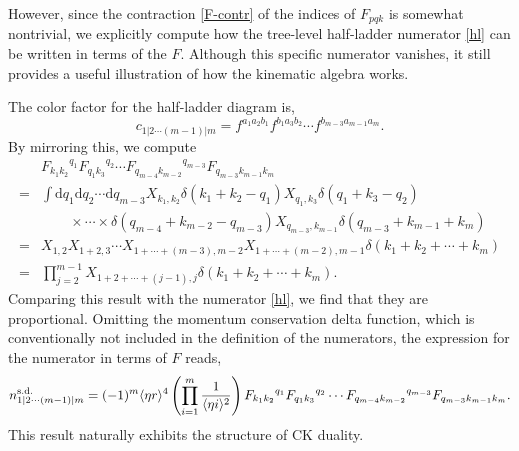 \documentclass[a4paper,11pt]{article}
\begin{document}
However, since the contraction \eqref{F-contr} of the indices of $F_{pqk}$ is somewhat nontrivial, 
we explicitly compute how the tree-level half-ladder numerator \eqref{hl} can be written in terms of the $F$. 
Although this specific numerator vanishes, it still provides a useful illustration of how the kinematic algebra works.\par
The color factor for the half-ladder diagram is,
\begin{equation}
    c_{1|2\cdots(m-1)|m}=f^{a_1a_2 b_1}f^{b_1a_3b_2}\cdots f^{b_{m-3}a_{m-1}a_{m}}.
\end{equation}
By mirroring this, we compute
\begin{equation}
    \begin{split}
    &{F_{k_1k_2}}^{q_1}{F_{q_1k_3}}^{q_2}\cdots {F_{q_{m-4}k_{m-2}}}^{q_{m-3}}{F_{q_{m-3}k_{m-1}k_m}}\\
    =&\int \mathrm{d}q_1\mathrm{d}q_2\cdots \mathrm{d}q_{m-3}X_{k_1,k_2}\delta(k_1+k_2-q_1)X_{q_1,k_3}\delta(q_1+k_3-q_2)\\
    &\qquad\times \cdots \times\delta(q_{m-4}+k_{m-2}-q_{m-3})X_{q_{m-3},k_{m-1}}\delta(q_{m-3}+k_{m-1}+k_m)\\
    =&X_{1,2}X_{1+2,3}\cdots X_{1+\cdots+(m-3),m-2}X_{1+\cdots+(m-2),m-1}\delta(k_1+k_2+\cdots +k_m)\\
    =&\prod_{j=2}^{m-1}X_{1+2+\cdots+(j-1),j}\delta(k_1+k_2+\cdots +k_m).
    \end{split}
\end{equation}
Comparing this result with the numerator \eqref{hl}, we find that they are proportional. Omitting the momentum conservation delta function, 
which is conventionally not included in the definition of the numerators, the expression for the numerator in terms of $F$ reads,
\begin{equation}
    n^{\text{s.d.}}_{1|2\cdots (m-1)|m}=(-1)^m\langle \eta r \rangle^4\left(\prod_{i=1}^m\frac{1}{\langle\eta i\rangle^2}\right){F_{k_1k_2}}^{q_1}{F_{q_1k_3}}^{q_2}\cdots {F_{q_{m-4}k_{m-2}}}^{q_{m-3}}{F_{q_{m-3}k_{m-1}k_m}}.
\end{equation}
This result naturally exhibits the structure of CK duality.
\end{document}
